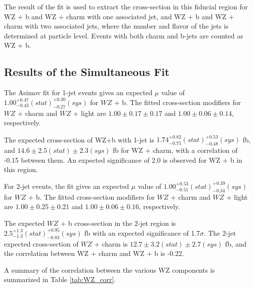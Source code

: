 The result of the fit is used to extract the cross-section in this fiducial region for WZ + b and WZ + charm with one associated jet, and WZ + b and WZ + charm with two associated jets, where the number and flavor of the jets is determined at particle level. Events with both charm and b-jets are counted as WZ + b.

\subsection{Results of the Simultaneous Fit}
\label{sec:resSum}

The Asimov fit for 1-jet events gives an expected $\mu$ value of $1.00^{+0.47}_{-0.43}(stat)^{+0.30}_{-0.27}(sys)$ for $WZ$ + b. The fitted cross-section modifiers for $WZ$ + charm and $WZ$ + light are $1.00 \pm 0.17 \pm 0.17$ and $1.00 \pm 0.06 \pm 0.14 $, respectively.

The expected cross-section of WZ+b with 1-jet is $1.74^{+0.82}_{-0.75}(stat)^{+0.53}_{-0.48}(sys)$ fb, and $14.6 \pm 2.5 (stat) \pm 2.3 (sys)$ fb for WZ + charm, with a correlation of -0.15 between them. An expected significance of 2.0 is observed for WZ + b in this region. 

For 2-jet events, the fit gives an expected $\mu$ value of $1.00^{+0.53}_{-0.51}(stat)^{+0.39}_{-0.34}(sys)$ for $WZ$ + b. The fitted cross-section modifiers for $WZ$ + charm and $WZ$ + light are $1.00 \pm 0.25 \pm 0.21$ and $1.00 \pm 0.06 \pm 0.16 $, respectively.

The expected $WZ$ + b cross-section in the 2-jet region is $2.5^{+1.3}_{-1.3}(stat)^{+0.95}_{-0.83}(sys)$ fb with an expected significance of 1.7$\sigma$. The 2-jet expected cross-section of $WZ$ + charm is $12.7 \pm 3.2 (stat) \pm 2.7 (sys)$ fb, and the correlation between WZ + charm and WZ + b is -0.22. 

A summary of the correlation between the various WZ components is summarized in Table \ref{tab:WZ_corr}.

